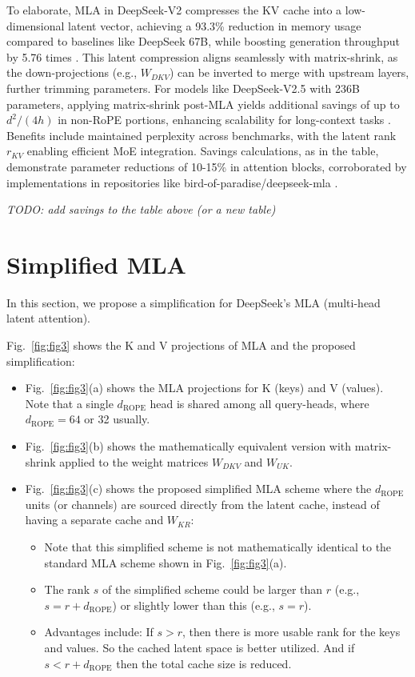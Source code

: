 \documentclass{article}
\begin{document}
To elaborate, MLA in DeepSeek-V2 compresses the KV cache into a low-dimensional latent vector, achieving a 93.3\% reduction in memory usage compared to baselines like DeepSeek 67B, while boosting generation throughput by 5.76 times \cite{deepseek2024}. This latent compression aligns seamlessly with matrix-shrink, as the down-projections (e.g., $W_{DKV}$) can be inverted to merge with upstream layers, further trimming parameters. For models like DeepSeek-V2.5 with 236B parameters, applying matrix-shrink post-MLA yields additional savings of up to $d^{2} / (4h)$ in non-RoPE portions, enhancing scalability for long-context tasks \cite{medium2025deepseek}. Benefits include maintained perplexity across benchmarks, with the latent rank $r_{KV}$ enabling efficient MoE integration. Savings calculations, as in the table, demonstrate parameter reductions of 10-15\% in attention blocks, corroborated by implementations in repositories like bird-of-paradise/deepseek-mla \cite{towardsai2024mla}.

\textit{TODO: add savings to the table above (or a new table)}

\section{Simplified MLA}
In this section, we propose a simplification for DeepSeek’s MLA (multi-head latent attention).

Fig.~\ref{fig:fig3} shows the K and V projections of MLA and the proposed simplification:

\begin{itemize}
\item Fig.~\ref{fig:fig3}(a) shows the MLA projections for K (keys) and V (values). Note that a single $d_{\text{ROPE}}$ head is shared among all query-heads, where $d_{\text{ROPE}} = 64$ or 32 usually.
\item Fig.~\ref{fig:fig3}(b) shows the mathematically equivalent version with matrix-shrink applied to the weight matrices $W_{DKV}$ and $W_{UK}$.
\item Fig.~\ref{fig:fig3}(c) shows the proposed simplified MLA scheme where the $d_{\text{ROPE}}$ units (or channels) are sourced directly from the latent cache, instead of having a separate cache and $W_{KR}$:
  \begin{itemize}
    \item Note that this simplified scheme is not mathematically identical to the standard MLA scheme shown in Fig.~\ref{fig:fig3}(a).
    \item The rank $s$ of the simplified scheme could be larger than $r$ (e.g., $s = r + d_{\text{ROPE}}$) or slightly lower than this (e.g., $s = r$).
    \item Advantages include: If $s > r$, then there is more usable rank for the keys and values. So the cached latent space is better utilized. And if $s < r + d_{\text{ROPE}}$ then the total cache size is reduced.
  \end{itemize}
\end{itemize}
\end{document}
